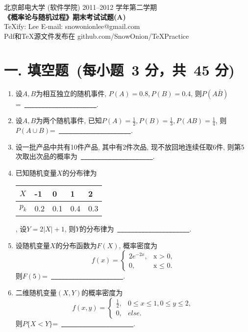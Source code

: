 \documentclass[a4paper,11pt]{article}
\newcommand{\blank}{\uline{\textcolor{white}{a}\ \textcolor{white}{a}\ \textcolor{white}{a}\ \textcolor{white}{a}\ \textcolor{white}{a}\ \textcolor{white}{a}\ \textcolor{white}{a}\ \textcolor{white}{a}\ \textcolor{white}{a}\ \textcolor{white}{a}\ \textcolor{white}{a}}}
\begin{document}
\begin{CJK}{GBK}{song}


\begin{center}
北京邮电大学 (软件学院) 2011--2012 学年第二学期\\
{\Large
\textbf{《概率论与随机过程》期末考试试题(A)}
}
\\
TeXify: Lee E-mail: snowonionlee@gmail.com
\\
Pdf和TeX源文件发布在 github.com/SnowOnion/TeXPractice
\end{center}

\section*{一. 填空题~(每小题~3 分，共~45 分)}
\begin{enumerate}
\item 设$A,B$为相互独立的随机事件, $P(A)=0.8, P(B)=0.4$, 则$P(A\bar{B})$=~\blank.

\item 设$A,B$为两个随机事件, 已知$\displaystyle{ P(A)=\frac{1}{2}, P(B)=\frac{1}{3}, P(AB)=\frac{1}{4} }$, 则$P(A\cup B)$=~\blank.

\item 设一批产品中共有10件产品, 其中有2件次品, 现不放回地连续任取6件, 则第5次取出次品的概率为~\blank.

\item 已知随机变量$X$的分布律为
\begin{tabular}{l|llll}
$X$ & -1 & 0 & 1 & 2 \\
\hline
$p_k$ & 0.2 & 0.1 & 0.4 & 0.3
\end{tabular},
设$Y=2\vert X\vert +1$, 则$Y$的分布律为~\blank.



\item 设随机变量$X$的分布函数为$F(X)$, 概率密度为
\[
f(x)=
\left\{
\begin{array}{ll}
2e^{-2x},&\textrm{x $>$ 0,} \\
0,&\textrm{x $\le$ 0.}
\end{array}
\right.
\]
则$F(5)$=~\blank.

\item 二维随机变量$(X,Y)$的概率密度为
\begin{displaymath}
f(x,y)=
\left\{
\begin{array}{ll}
\displaystyle{ \frac{1}{2} }, & \textrm{$0 \le x \le 1, 0 \le y \le 2,$} \\
0, & \textrm{$else$.}
\end{array}
\right.
\end{displaymath}
则$P\{X<Y\}$=~\blank.


\end{enumerate}
\end{CJK}
\end{document}
